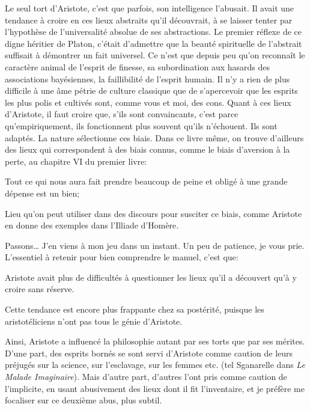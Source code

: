 Le seul tort d'Aristote, c'est que parfois, son intelligence l'abusait. Il avait une tendance à croire en ces lieux
abstraits qu'il découvrait, à se laisser tenter par l'hypothèse de l'universalité absolue de ses abstractions.
Le premier réflexe de ce digne héritier de Platon, c'était d'admettre que la beauté spirituelle de l'abstrait suffisait
à démontrer un fait universel. Ce n'est que depuis peu qu'on reconnaît le caractère animal de l'esprit de finesse, sa
subordination aux hasards des associations bayésiennes, la faillibilité de l'esprit humain. Il n'y a rien de plus
difficile à une âme pétrie de culture classique que de s'apercevoir que les esprits les plus polis et cultivés sont,
comme vous et moi, des cons. Quant à ces lieux d'Aristote, il faut croire que, s'ils sont convaincants, c'est parce
qu'empiriquement, ils fonctionnent plus souvent qu'ils n'échouent. Ils sont adaptés. La nature sélectionne ces biais.
Dans ce livre même, on trouve d'ailleurs des lieux qui correspondent à des biais connus, comme le biais d'aversion à
la perte, au chapitre VI du premier livre:

\begin{lieu}
	Tout ce qui nous aura fait prendre beaucoup de peine et obligé à une grande dépense est un bien;
\end{lieu}

Lieu qu'on peut utiliser dans des discours pour susciter ce biais, comme Aristote en donne des exemples dans l'Illiade
d'Homère.

Passons\dots{} J'en viens à mon jeu dans un instant. Un peu de patience, je vous prie. L'essentiel à retenir pour
bien comprendre le manuel, c'est que:

\begin{emphpar}
	Aristote avait plus de difficultés à questionner les lieux qu'il a découvert qu'à y croire sans réserve.

	Cette tendance est encore plus frappante chez sa postérité, puisque les aristotéliciens n'ont pas tous le génie
	d'Aristote.

	Ainsi, Aristote a influencé la philosophie autant par ses torts que par ses mérites. D'une part, des esprits
	bornés se sont servi d'Aristote comme caution de leurs préjugés sur la science, sur l'esclavage, sur les femmes
	etc. (tel Sganarelle dans \emph{Le Malade Imaginaire}). Mais d'autre part, d'autres l'ont pris comme caution de
	l'implicite, en usant abusivement des lieux dont il fit l'inventaire, et je préfère me focaliser sur ce deuxième
	abus, plus subtil.
\end{emphpar}

